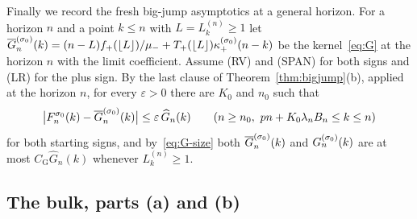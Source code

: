 Finally we record the fresh big-jump asymptotics at a general horizon. For a
horizon $n$ and a point $k\le n$ with $L=L^{(n)}_k\ge1$ let
$\overline G^{(\sigma_0)}_n(k)=(n-L)f_{+}(\lfloor L\rfloor)/\mu_{-}
+T_{+}(\lfloor L\rfloor)\kappa^{(\sigma_0)}_{+}(n-k)$ be the kernel~\eqref{eq:G} at the
horizon $n$ with the limit coefficient. Assume (RV) and (SPAN) for both signs and
(LR) for the plus sign. By the last clause of Theorem~\ref{thm:bigjump}(b), applied at
the horizon $n$, for every $\varepsilon>0$ there are $K_0$ and $n_0$ such that
\begin{equation}\label{eq:unif-bigjump}
 \bigl|F^{\sigma_0}_n(k)-\overline G^{(\sigma_0)}_n(k)\bigr|\le\varepsilon\,\widehat G_n(k)
 \qquad(n\ge n_0,\ pn+K_0\lambda_nB_n\le k\le n)
\end{equation}
for both starting signs, and by~\eqref{eq:G-size} both
$\overline G^{(\sigma_0)}_n(k)$ and $G^{(\sigma_0)}_n(k)$ are at most $C_{\mathrm G}\widehat G_n(k)$
whenever $L^{(n)}_k\ge1$.

\subsection{The bulk, parts (a) and (b)}\label{sec:prep-bulk}

